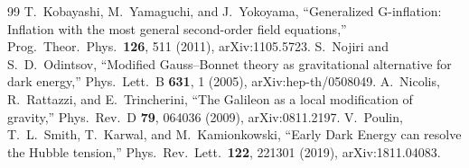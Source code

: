 \documentclass[12pt,a4paper]{article}
\theoremstyle{plain}
\begin{document}
\begin{thebibliography}{99}
  T.~Kobayashi, M.~Yamaguchi, and J.~Yokoyama,
  ``Generalized G-inflation: Inflation with the most general second-order
    field equations,''
  Prog.\ Theor.\ Phys.\ \textbf{126}, 511 (2011), arXiv:1105.5723.
  S.~Nojiri and S.~D.~Odintsov,
  ``Modified Gauss--Bonnet theory as gravitational alternative for dark
    energy,''
  Phys.\ Lett.\ B \textbf{631}, 1 (2005), arXiv:hep-th/0508049.
  A.~Nicolis, R.~Rattazzi, and E.~Trincherini,
  ``The Galileon as a local modification of gravity,''
  Phys.\ Rev.\ D \textbf{79}, 064036 (2009), arXiv:0811.2197.
  V.~Poulin, T.~L.~Smith, T.~Karwal, and M.~Kamionkowski,
  ``Early Dark Energy can resolve the Hubble tension,''
  Phys.\ Rev.\ Lett.\ \textbf{122}, 221301 (2019), arXiv:1811.04083.
\end{thebibliography}
\end{document}
